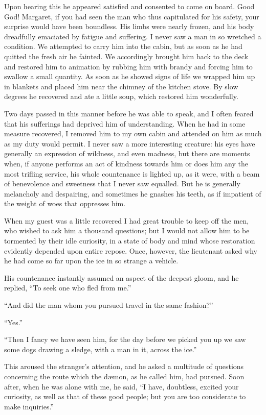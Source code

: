 \documentclass[12pt,openright]{book}
\begin{document}
Upon hearing this he appeared satisfied and consented to come on board. Good God! Margaret, if you had seen the man who thus capitulated for his safety, your surprise would have been boundless. His limbs were nearly frozen, and his body dreadfully emaciated by fatigue and suffering. I never saw a man in so wretched a condition. We attempted to carry him into the cabin, but as soon as he had quitted the fresh air he fainted. We accordingly brought him back to the deck and restored him to animation by rubbing him with brandy and forcing him to swallow a small quantity. As soon as he showed signs of life we wrapped him up in blankets and placed him near the chimney of the kitchen stove. By slow degrees he recovered and ate a little soup, which restored him wonderfully.

Two days passed in this manner before he was able to speak, and I often feared that his sufferings had deprived him of understanding. When he had in some measure recovered, I removed him to my own cabin and attended on him as much as my duty would permit. I never saw a more interesting creature: his eyes have generally an expression of wildness, and even madness, but there are moments when, if anyone performs an act of kindness towards him or does him any the most trifling service, his whole countenance is lighted up, as it were, with a beam of benevolence and sweetness that I never saw equalled. But he is generally melancholy and despairing, and sometimes he gnashes his teeth, as if impatient of the weight of woes that oppresses him.

When my guest was a little recovered I had great trouble to keep off the men, who wished to ask him a thousand questions; but I would not allow him to be tormented by their idle curiosity, in a state of body and mind whose restoration evidently depended upon entire repose. Once, however, the lieutenant asked why he had come so far upon the ice in so strange a vehicle.

His countenance instantly assumed an aspect of the deepest gloom, and he replied, “To seek one who fled from me.”

“And did the man whom you pursued travel in the same fashion?”

“Yes.”

“Then I fancy we have seen him, for the day before we picked you up we saw some dogs drawing a sledge, with a man in it, across the ice.”

This aroused the stranger’s attention, and he asked a multitude of questions concerning the route which the dæmon, as he called him, had pursued. Soon after, when he was alone with me, he said, “I have, doubtless, excited your curiosity, as well as that of these good people; but you are too considerate to make inquiries.”
\end{document}
